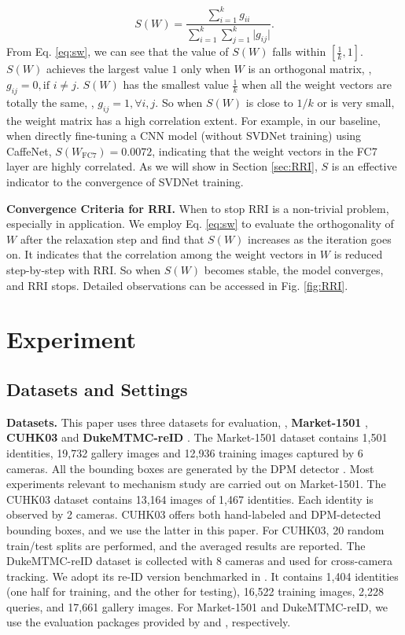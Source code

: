 \documentclass[10pt,twocolumn,letterpaper]{article}
\begin{document}
\begin{equation}\label{eq:sw}
S(W)=\frac{\sum_{i=1}^{k}g_{ii}}{\sum_{i=1}^{k}\sum_{j=1}^{k}\vert g_{ij}\vert}.
\end{equation}
From Eq. \ref{eq:sw}, we can see that the value of $S(W)$ falls within $[\frac{1}{k}, 1]$. $S(W)$ achieves the largest value $1$ only when $W$ is an orthogonal matrix, \ie, $g_{ij} = 0, \mbox{if } i\neq j$. $S(W)$ has the smallest value $\frac{1}{k}$ when all the weight vectors are totally the same, \ie, $g_{ij} = 1,  \forall i,j$. So when $S(W)$ is close to $1/k$ or is very small, the weight matrix has a high correlation extent. For example, in our baseline, when directly fine-tuning a CNN model (without SVDNet training) using CaffeNet, $S(W_{\mbox{FC7}})=0.0072$, indicating that the weight vectors in the FC7 layer are highly correlated. As we will show in Section \ref{sec:RRI}, $S$ is an effective indicator to the convergence of SVDNet training.

\textbf{Convergence Criteria for RRI.}
When to stop RRI is a non-trivial problem, especially in application. We employ Eq. \ref{eq:sw} to evaluate the orthogonality of $W$ after the relaxation step and find that $S(W)$ increases as the iteration goes on. It indicates that the correlation among the weight vectors in $W$ is reduced step-by-step with RRI. So when $S(W)$ becomes stable, the model converges, and RRI stops. Detailed observations can be accessed in Fig. \ref{fig:RRI}.


\section{Experiment}

\subsection{Datasets and Settings}
\textbf{Datasets.} 
This paper uses three datasets for evaluation, \ie,  \textbf{Market-1501} \cite{DBLP:conf/iccv/ZhengSTWWT15}, \textbf{CUHK03} \cite{DBLP:conf/cvpr/LiZXW14} and \textbf{DukeMTMC-reID} \cite{ristani2016MTMC,zheng2017unlabeled}. The Market-1501 dataset contains 1,501 identities, 19,732 gallery images and 12,936 training images captured by 6 cameras. All the bounding boxes are generated by the DPM detector \cite{felzenszwalb2008discriminatively}. Most experiments relevant to mechanism study are carried out on Market-1501. The CUHK03 dataset contains 13,164 images of 1,467 identities. Each identity is observed by 2 cameras. CUHK03 offers both hand-labeled and DPM-detected bounding boxes, and we use the latter in this paper. For CUHK03, 20 random train/test splits are performed, and the averaged results are reported. The DukeMTMC-reID dataset is collected with 8 cameras and used for cross-camera tracking. We adopt its re-ID version benchmarked in \cite{zheng2017unlabeled}. It contains 1,404 identities (one half for training, and the other for testing), 16,522 training images, 2,228 queries, and 17,661 gallery images. For Market-1501 and DukeMTMC-reID, we use the evaluation packages provided by \cite{DBLP:conf/iccv/ZhengSTWWT15} and \cite{zheng2017unlabeled}, respectively.
\end{document}
